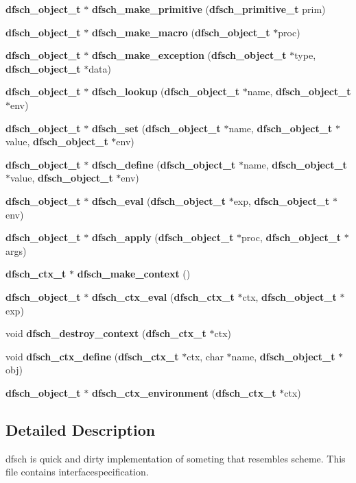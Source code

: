 \begin{CompactItemize}
\item 
{\bf dfsch\_\-object\_\-t} $\ast$ {\bf dfsch\_\-make\_\-primitive} ({\bf dfsch\_\-primitive\_\-t} prim)
\item 
{\bf dfsch\_\-object\_\-t} $\ast$ {\bf dfsch\_\-make\_\-macro} ({\bf dfsch\_\-object\_\-t} $\ast$proc)
\item 
{\bf dfsch\_\-object\_\-t} $\ast$ {\bf dfsch\_\-make\_\-exception} ({\bf dfsch\_\-object\_\-t} $\ast$type, {\bf dfsch\_\-object\_\-t} $\ast$data)
\item 
{\bf dfsch\_\-object\_\-t} $\ast$ {\bf dfsch\_\-lookup} ({\bf dfsch\_\-object\_\-t} $\ast$name, {\bf dfsch\_\-object\_\-t} $\ast$env)
\item 
{\bf dfsch\_\-object\_\-t} $\ast$ {\bf dfsch\_\-set} ({\bf dfsch\_\-object\_\-t} $\ast$name, {\bf dfsch\_\-object\_\-t} $\ast$value, {\bf dfsch\_\-object\_\-t} $\ast$env)
\item 
{\bf dfsch\_\-object\_\-t} $\ast$ {\bf dfsch\_\-define} ({\bf dfsch\_\-object\_\-t} $\ast$name, {\bf dfsch\_\-object\_\-t} $\ast$value, {\bf dfsch\_\-object\_\-t} $\ast$env)
\item 
{\bf dfsch\_\-object\_\-t} $\ast$ {\bf dfsch\_\-eval} ({\bf dfsch\_\-object\_\-t} $\ast$exp, {\bf dfsch\_\-object\_\-t} $\ast$env)
\item 
{\bf dfsch\_\-object\_\-t} $\ast$ {\bf dfsch\_\-apply} ({\bf dfsch\_\-object\_\-t} $\ast$proc, {\bf dfsch\_\-object\_\-t} $\ast$args)
\item 
{\bf dfsch\_\-ctx\_\-t} $\ast$ {\bf dfsch\_\-make\_\-context} ()
\item 
{\bf dfsch\_\-object\_\-t} $\ast$ {\bf dfsch\_\-ctx\_\-eval} ({\bf dfsch\_\-ctx\_\-t} $\ast$ctx, {\bf dfsch\_\-object\_\-t} $\ast$exp)
\item 
void {\bf dfsch\_\-destroy\_\-context} ({\bf dfsch\_\-ctx\_\-t} $\ast$ctx)
\item 
void {\bf dfsch\_\-ctx\_\-define} ({\bf dfsch\_\-ctx\_\-t} $\ast$ctx, char $\ast$name, {\bf dfsch\_\-object\_\-t} $\ast$obj)
\item 
{\bf dfsch\_\-object\_\-t} $\ast$ {\bf dfsch\_\-ctx\_\-environment} ({\bf dfsch\_\-ctx\_\-t} $\ast$ctx)\label{dfsch_8h_a50}

\end{CompactItemize}


\subsection{Detailed Description}
dfsch is quick and dirty implementation of someting that resembles scheme. This file contains interfacespecification.

